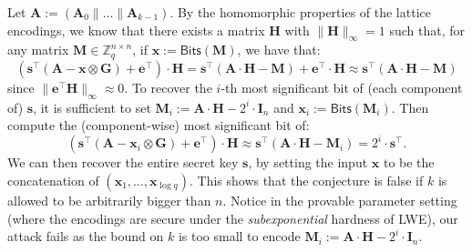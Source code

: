 \documentclass{article}
\newcommand{\Z}{\mathbb{Z}}
\newcommand{\id}{\ensuremath{\mathbf{I}}}
\begin{document}
Let $\mathbf{A}:=(\mathbf{A}_0 \mathbin{\|}\dots\mathbin{\|}\mathbf{A}_{k-1})$. By the homomorphic properties of the lattice encodings, we know that there exists a matrix $\mathbf{H}$ with $\|\mathbf{H}\|_\infty =1$ such that, for any matrix $\mathbf{M}\in\Z_q^{n\times n}$, if $\mathbf{x}:=\mathsf{Bits}(\mathbf{M})$, we have that:
\[
(\mathbf{s}^\intercal(\mathbf{A} - \mathbf{x}\otimes  \mathbf{G}) + \mathbf{e}^\intercal)\cdot \mathbf{H}= \mathbf{s}^\intercal  (\mathbf{A}\cdot \mathbf{H}-\mathbf{M}) + \mathbf{e}^\intercal \cdot \mathbf{H}
\approx \mathbf{s}^\intercal (\mathbf{A}\cdot \mathbf{H}-\mathbf{M})
\]
since $\|\mathbf{e}^\intercal  \mathbf{H}\|_\infty \approx 0$.  
To recover the $i$-th most significant bit of (each component of) $\mathbf{s}$, it is sufficient to set $\mathbf{M}_i:=\mathbf{A}\cdot \mathbf{H}- 2^i\cdot \id_n$ and $\mathbf{x}_i := \mathsf{Bits}(\mathbf{M}_i)$. Then compute the (component-wise) most significant bit of:
\[
(\mathbf{s}^\intercal(\mathbf{A} - \mathbf{x}_i\otimes  \mathbf{G}) + \mathbf{e}^\intercal)\cdot \mathbf{H} \approx \mathbf{s}^\intercal (\mathbf{A}\cdot \mathbf{H}-\mathbf{M}_i) = 2^i\cdot\mathbf{s}^\intercal.
\]
We can then recover the entire secret key $\mathbf{s}$, by setting the input $\mathbf{x}$ to be the concatenation of $(\mathbf{x}_1, \dots, \mathbf{x}_{\log q})$. This shows that the conjecture is false if $k$ is allowed to be arbitrarily bigger than $n$. Notice in the provable parameter setting (where the encodings are secure under the \emph{subexponential} hardness of LWE), our attack fails as the bound on $k$ is too small to encode $\mathbf{M}_i:=\mathbf{A}\cdot \mathbf{H}- 2^i\cdot \id_n$.

\newpage
   
 
\end{document}

